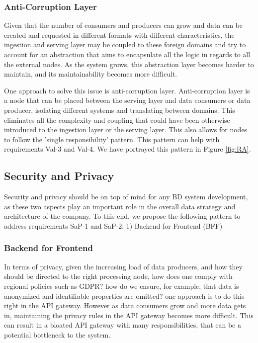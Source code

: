 \documentclass[a4paper,11pt,article,oneside]{memoir}
\begin{document}
\subsubsection{Anti-Corruption Layer}

Given that the number of consumers and producers can grow and data can be created and requested in different formats with different characteristics, the ingestion and serving layer may be coupled to these foreign domains and try to account for an abstraction that aims to encapsulate all the logic in regards to all the external nodes. As the system grows, this abstraction layer becomes harder to maintain, and its maintainability becomes more difficult. 

One approach to solve this issue is anti-corruption layer. Anti-corruption layer is a node that can be placed between the serving layer and data consumers or data producer, isolating different systems and translating between domains. This eliminates all the complexity and coupling that could have been otherwise introduced to the ingestion layer or the serving layer. This also allows for nodes to follow the 'single responsibility' pattern. This pattern can help with requirements Val-3 and Val-4. We have portrayed this pattern in Figure \ref{fig:RA}.


\subsection{Security and Privacy}

Security and privacy should be on top of mind for any BD system development, as these two aspects play an important role in the overall data strategy and architecture of the company. To this end, we propose the following pattern to address requirements SaP-1 and SaP-2; 1) Backend for Frontend (BFF)

\subsubsection{Backend for Frontend}

In terms of privacy, given the increasing load of data producers, and how they should be directed to the right processing node, how does one comply with regional policies such as GDPR? how do we ensure, for example, that data is anonymized and identifiable properties are omitted? one approach is to do this right in the API gateway. However as data consumers grow and more data gets in, maintaining the privacy rules in the API gateway becomes more difficult. This can result in a bloated API gateway with many responsibilities, that can be a potential bottleneck to the system.
\end{document}
